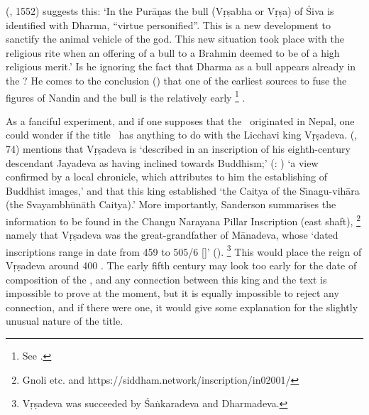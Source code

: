 \documentclass[11pt]{book}
\begin{document}
\citeauthor{bhattacharya_nandin_1977} (\citeyear{bhattacharya_nandin_1977}, {1552}) suggests this:
`In the Purāṇas the bull 
(Vṛṣabha or 
Vṛṣa) 
of Śiva is identified with Dharma, ``virtue personified''. 
This is a new development to sanctify the animal 
vehicle of the god. This new situation took place with the religious 
rite when an offering of a bull to a Brahmin deemed to be
of a high religious merit.' Is he ignoring the fact that Dharma as
a bull appears already in the \MBh?
He comes to the conclusion 
()
that one of the earliest sources to fuse the figures
of Nandin and the bull is the relatively early%
		\footnote{See .}
\MatsP.


As a fanciful experiment, and if one supposes that the 
\VSS\ originated in Nepal, one could wonder if the 
title \Vss\ has anything to do with the Licchavi king
Vṛṣadeva.
\citeauthor{SandersonSaivaAge} 
(\citeyear{SandersonSaivaAge}, 74) mentions that  
Vṛṣadeva is `described in an inscription of his eighth-century 
descendant Jayadeva as having inclined towards Buddhism;'
(: 
) 
`a view conﬁrmed by a local chronicle, which attributes to
him the establishing of Buddhist images,'
and that this king established 
`the Caitya of the Sı̄nagu-vihāra (the Svayambhūnāth Caitya).'
More importantly, Sanderson summarises the 
information to be found in the 
Changu Narayana Pillar Inscription (east shaft),%
		\footnote{Gnoli etc. and 
		https://siddham.network/inscription/in02001/} 
namely that Vṛṣadeva was the great-grandfather of Mānadeva, whose
`dated inscriptions range in date from 459 to 505/6 [\CE]'
().%
	   \footnote{Vṛṣadeva was succeeded by Śaṅkaradeva and
	   		            Dharmadeva.}
This would place 
the reign of Vṛṣadeva around 400 \CE. 
The early fifth century may look too early for the date of composition
of the \Vss, and any connection between this king
and the text is impossible to prove at the moment, 
but it is equally impossible to reject any connection, 
and if there were one, it would give some explanation for the slightly
unusual nature of the title.
\hide{
}
\end{document}
